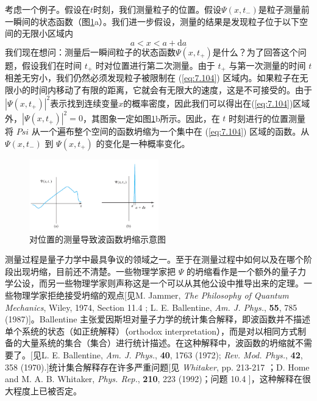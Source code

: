     考虑一个例子。假设在$t$时刻，我们测量粒子的位置。假设$\Psi\left(x,t_-\right)$是粒子测量前一瞬间的状态函数（图\ref{fig:7.6}a）。我们进一步假设，测量的结果是发现粒子位于以下空间的无限小区域内
    \begin{equation}
        a < x < a + \mathrm{d}a
        \label{eq:7.104}
    \end{equation}
    我们现在想问：测量后一瞬间粒子的状态函数$\Psi\left(x,t_+\right)$是什么？为了回答这个问题，假设我们在时间 $t_+$ 时对位置进行第二次测量。由于 $t_+$ 与第一次测量的时间 $t$ 相差无穷小，我们仍然必须发现粒子被限制在 (\ref{eq:7.104}) 区域内。如果粒子在无限小的时间内移动了有限的距离，它就会有无限大的速度，这是不可接受的。由于$\left|\Psi\left(x,t_+\right)\right|^2$表示找到连续变量$x$的概率密度，因此我们可以得出在(\ref{eq:7.104})区域外，$\left|\Psi\left(x,t_+\right)\right|^2=0$，其图象一定如图\ref{fig:7.6}b所示。因此，在 $t$ 时刻进行的位置测量将 $Psi$ 从一个遍布整个空间的函数坍缩为一个集中在 (\ref{eq:7.104}) 区域的函数。从$\Psi\left(x,t_-\right)$ 到 $\Psi\left(x,t_+\right)$ 的变化是一种概率变化。
    \begin{figure}[h!]
        \centering
        \includegraphics[width=0.5\textwidth]{Figures/7.6.png}
        \caption{对位置的测量导致波函数坍缩示意图}
        \label{fig:7.6}
    \end{figure}

    测量过程是量子力学中最具争议的领域之一。至于在测量过程中如何以及在哪个阶段出现坍缩，目前还不清楚。一些物理学家把 $\Psi$ 的坍缩看作是一个额外的量子力学公设，而另一些物理学家则声称这是一个可以从其他公设中推导出来的定理。一些物理学家拒绝接受坍缩的观点[见M. Jammer, \textit{The Philosophy of Quantum Mechanics}, Wiley, 1974, Section 11.4 ; L. E. Ballentine, \textit{Am. J. Phys.}, \textbf{55}, 785 (1987)]。Ballentine 主张爱因斯坦对量子力学的统计集合解释，即波函数并不描述单个系统的状态（如正统解释）（orthodox interpretation），而是对以相同方式制备的大量系统的集合（集合）进行统计描述。在这种解释中，波函数的坍缩就不需要了。[见L. E. Ballentine, \textit{Am. J. Phys.}, \textbf{40}, 1763 (1972); \textit{Rev. Mod. Phys.}, \textbf{42}, 358 (1970).]统计集合解释存在许多严重问题[见 \textit{Whitaker}, pp. 213-217 ；D. Home and M. A. B. Whitaker, \textit{Phys. Rep.}, \textbf{210}, 223 (1992)；问题 10.4 ]，这种解释在很大程度上已被否定。

